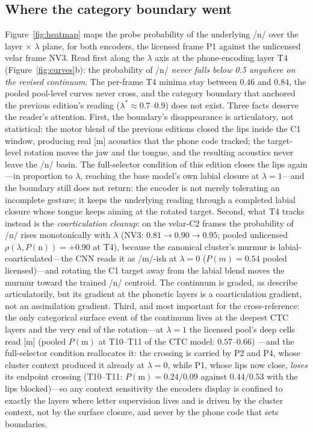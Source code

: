 \documentclass[11pt,a4paper]{article}
\newcommand{\lam}{\lambda}
\begin{document}
\subsection{Where the category boundary went}

Figure~\ref{fig:heatmap} maps the probe probability of the underlying
/n/ over the layer $\times$ $\lam$ plane, for both encoders, the
licensed frame P1 against the unlicensed velar frame NV3. Read first
along the $\lam$ axis at the phone-encoding layer T4
(Figure~\ref{fig:curves}b): the probability of /n/ \emph{never falls
below 0.5 anywhere on the revised continuum}. The per-frame T4 minima
stay between $0.46$ and $0.84$, the pooled pool-level curves never
cross, and the category boundary that anchored the previous edition's
reading ($\lam^{*} \approx 0.7$--$0.9$) does not exist. Three facts
deserve the reader's attention. First, the boundary's disappearance is
articulatory, not statistical: the motor blend of the previous
editions closed the lips inside the C1 window, producing real [m]
acoustics that the phone code tracked; the target-level rotation
moves the jaw and the tongue, and the resulting acoustics never leave
the /n/ basin. The full-selector condition of this edition closes
the lips again---in proportion to $\lam$, reaching the base model's
own labial closure at $\lam=1$---and the boundary still does not
return: the encoder is not merely tolerating an incomplete gesture;
it keeps the underlying reading through a completed labial closure
whose tongue keeps aiming at the rotated target. Second, what T4 tracks instead is the \emph{coarticulation
cleanup}: on the velar-C2 frames the probability of /n/ rises
monotonically with $\lam$ (NV3: $0.81 \to 0.90 \to 0.95$; pooled
unlicensed $\rho(\lam, P(\mathrm{n})) = +0.90$ at T4), because the
canonical cluster's murmur is labial-coarticulated---the CNN reads it
as /m/-ish at $\lam=0$ ($P(m) = 0.54$ pooled licensed)---and rotating
the C1 target away from the labial blend moves the murmur toward the
trained /n/ centroid. The continuum is graded, as \citet{ellis2002}
describe articulatorily, but its gradient at the phonetic layers is a
coarticulation gradient, not an assimilation gradient. Third, and most
important for the cross-reference: the only categorical surface event
of the continuum lives at the deepest CTC layers and the very end of
the rotation---at $\lam=1$ the licensed pool's deep cells read [m]
(pooled $P(\mathrm{m})$ at T10--T11 of the CTC model: $0.57$--$0.66$)
---and the full-selector condition reallocates it: the crossing is
carried by P2 and P4, whose cluster context produced it already at
$\lam=0$, while P1, whose lips now close, \emph{loses} its endpoint
crossing (T10--T11: $P(\mathrm{m}) = 0.24/0.09$ against
$0.44/0.53$ with the lips blocked)---so any context sensitivity the
encoders display is confined to exactly the layers where letter
supervision lives and is driven by the cluster context, not by the
surface closure, and never by the phone code that sets boundaries.
\end{document}
